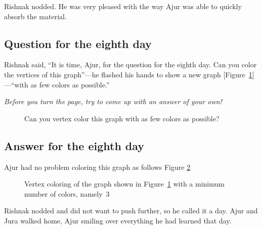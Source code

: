 Rishnak nodded. He was very pleased with the way Ajur was able to quickly absorb the material.

\subsection*{Question for the eighth day}
Rishnak said, ``It is time, Ajur, for the question for the eighth day. Can you color the vertices of this graph''---he flashed his hands to show a new graph [Figure~\ref{colorgq1}]---``with as few colors as possible.''

\textit{Before you turn the page, try to come up with an answer of your own!}

\begin{figure}
\begin{center}

\caption{Can you vertex color this graph with as few colors as possible?}\label{colorgq1}
\end{center}
\end{figure}

\newpage
\subsection*{Answer for the eighth day}
Ajur had no problem coloring this graph as follows Figure \ref{colorga1}

\begin{figure}
\begin{center}

\caption{Vertex coloring of the graph shown in Figure~\ref{colorgq1} with a minimum number of colors, namely~3}\label{colorga1}
\end{center}
\end{figure}

Rishnak nodded and did not want to push further, so he called it a day. Ajur and Jura walked home, Ajur smiling over everything he had learned that day.
